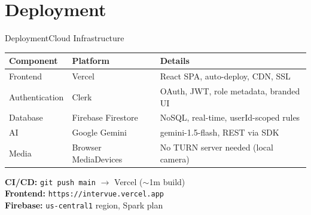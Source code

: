 \documentclass{beamer}
\begin{document}
\section{Deployment}
\begin{frame}{Deployment}{Cloud Infrastructure}
\scriptsize
\begin{table}
\centering
\scriptsize
\begin{tabular}{|l|l|p{3.8cm}|}
\hline
\textbf{Component} & \textbf{Platform} & \textbf{Details} \\ \hline
Frontend & Vercel & React SPA, auto-deploy, CDN, SSL \\ \hline
Authentication & Clerk & OAuth, JWT, role metadata, branded UI \\ \hline
Database & Firebase Firestore & NoSQL, real-time, userId-scoped rules \\ \hline
AI & Google Gemini & gemini-1.5-flash, REST via SDK \\ \hline
Media & Browser MediaDevices & No TURN server needed (local camera) \\ \hline
\end{tabular}
\end{table}
\textbf{CI/CD:} \texttt{git push main} $\rightarrow$ Vercel ($\sim$1m build)\\
\textbf{Frontend:} \texttt{https://intervue.vercel.app}\\
\textbf{Firebase:} \texttt{us-central1} region, Spark plan
\end{frame}

\end{document}
